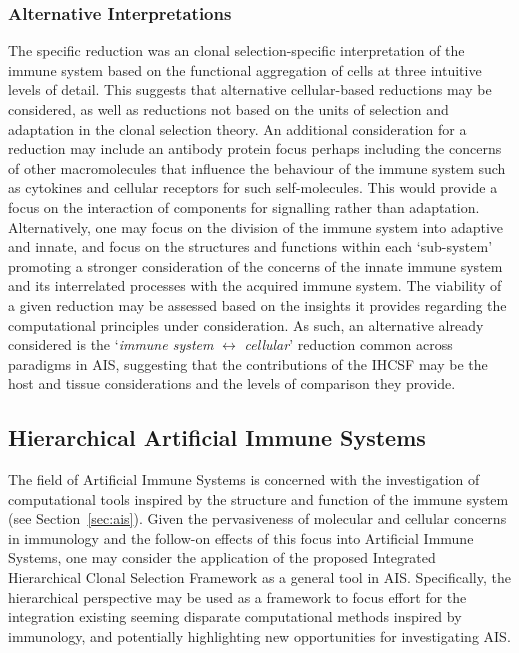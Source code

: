 \subsubsection{Alternative Interpretations}
The specific reduction was an clonal selection-specific interpretation of the immune system based on the functional aggregation of cells at three intuitive levels of detail. This suggests that alternative cellular-based reductions may be considered, as well as reductions not based on the units of selection and adaptation in the clonal selection theory. 
An additional consideration for a reduction may include an antibody protein focus perhaps including the concerns of other macromolecules that influence the behaviour of the immune system such as cytokines and cellular receptors for such self-molecules. This would provide a focus on the interaction of components for signalling rather than adaptation. Alternatively, one may focus on the division of the immune system into adaptive and innate, and focus on the structures and functions within each `sub-system' promoting a stronger consideration of the concerns of the innate immune system and its interrelated processes with the acquired immune system.
The viability of a given reduction may be assessed based on the insights it provides regarding the computational principles under consideration. As such, an alternative already considered is the `\emph{immune system} $\leftrightarrow$ \emph{cellular}' reduction common across paradigms in AIS, suggesting that the contributions of the IHCSF may be the host and tissue considerations and the levels of comparison they provide.

%
%
\subsection{Hierarchical Artificial Immune Systems}
\label{subsec:framework:ihcsf:applicability:ais}
The field of Artificial Immune Systems is concerned with the investigation of computational tools inspired by the structure and function of the immune system (see Section~\ref{sec:ais}). Given the pervasiveness of molecular and cellular concerns in immunology and the follow-on effects of this focus into Artificial Immune Systems, one may consider the application of the proposed Integrated Hierarchical Clonal Selection Framework as a general tool in AIS. Specifically, the hierarchical perspective may be used as a framework to focus effort for the integration existing seeming disparate computational methods inspired by immunology, and potentially highlighting new opportunities for investigating AIS.

